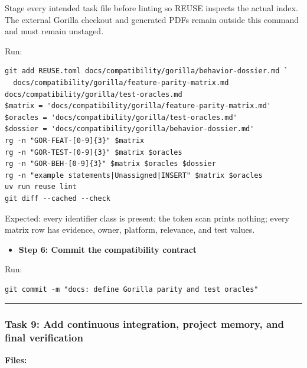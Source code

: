 \documentclass[
  letterpaper,
]{article}
\providecommand{\tightlist}{%
  \setlength{\itemsep}{0pt}\setlength{\parskip}{0pt}}
\begin{document}
Stage every intended task file before linting so REUSE inspects the actual index. The external Gorilla checkout and
generated PDFs remain outside this command and must remain unstaged.

Run:

\begin{lstlisting}
git add REUSE.toml docs/compatibility/gorilla/behavior-dossier.md `
  docs/compatibility/gorilla/feature-parity-matrix.md docs/compatibility/gorilla/test-oracles.md
$matrix = 'docs/compatibility/gorilla/feature-parity-matrix.md'
$oracles = 'docs/compatibility/gorilla/test-oracles.md'
$dossier = 'docs/compatibility/gorilla/behavior-dossier.md'
rg -n "GOR-FEAT-[0-9]{3}" $matrix
rg -n "GOR-TEST-[0-9]{3}" $matrix $oracles
rg -n "GOR-BEH-[0-9]{3}" $matrix $oracles $dossier
rg -n "example statements|Unassigned|INSERT" $matrix $oracles
uv run reuse lint
git diff --cached --check
\end{lstlisting}

Expected: every identifier class is present; the token scan prints nothing; every matrix row has evidence, owner,
platform, relevance, and test values.

\begin{itemize}
\tightlist
\item[$\boxtimes$]
  \textbf{Step 6: Commit the compatibility contract}
\end{itemize}

Run:

\begin{lstlisting}
git commit -m "docs: define Gorilla parity and test oracles"
\end{lstlisting}

\begin{center}\rule{0.5\linewidth}{0.5pt}\end{center}

\subsubsection{Task 9: Add continuous integration, project memory, and final
verification}\label{task-9-add-continuous-integration-project-memory-and-final-verification}

\textbf{Files:}
\end{document}
